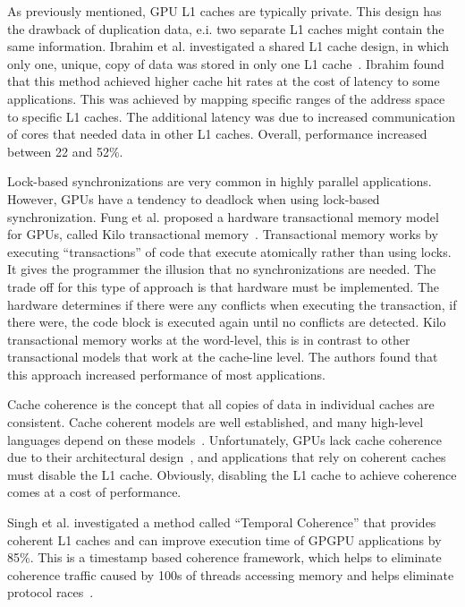 As previously mentioned, GPU L1 caches are typically private.
This design has the drawback of duplication data, e.i. two separate L1 caches might contain the same information.
Ibrahim et al. investigated a shared L1 cache design, in which only one, unique, copy of data was stored in only one L1 cache~\cite{Ibrahim2020}.
Ibrahim found that this method achieved higher cache hit rates at the cost of latency to some applications.
This was achieved by mapping specific ranges of the address space to specific L1 caches.
The additional latency was due to increased communication of cores that needed data in other L1 caches.
Overall, performance increased between 22 and 52\%.

Lock-based synchronizations are very common in highly parallel applications.
However, GPUs have a tendency to deadlock when using lock-based synchronization.
Fung et al. proposed a hardware transactional memory model for GPUs, called Kilo transactional memory~\cite{Fung2011ISM}.
Transactional memory works by executing ``transactions'' of code that execute atomically rather than using locks.
It gives the programmer the illusion that no synchronizations are needed.
The trade off for this type of approach is that hardware must be implemented.
The hardware determines if there were any conflicts when executing the transaction, if there were, the code block is executed again until no conflicts are detected.
Kilo transactional memory works at the word-level, this is in contrast to other transactional models that work at the cache-line level.
The authors found that this approach increased performance of most applications.

Cache coherence is the concept that all copies of data in individual caches are consistent.
Cache coherent models are well established, and many high-level languages depend on these models~\cite{Singh2013}.
Unfortunately, GPUs lack cache coherence due to their architectural design~\cite{Singh2013}, and applications that rely on coherent caches must disable the L1 cache.
Obviously, disabling the L1 cache to achieve coherence comes at a cost of performance.

Singh et al. investigated a method called ``Temporal Coherence'' that provides coherent L1 caches and can improve execution time of GPGPU applications by 85\%. This is a timestamp based coherence framework, which helps to eliminate coherence traffic caused by 100s of threads accessing memory and helps eliminate protocol races~\cite{Singh2013}.


